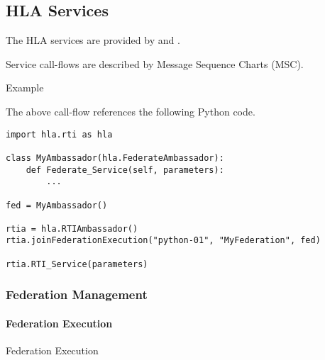 \subsection{HLA Services}

The HLA services are provided by  and .

Service call-flows are described by Message Sequence Charts (MSC).

\begin{hlamsc}{Example}

\nextlevel
{}
\end{hlamsc}

The above call-flow references the following Python code.

\begin{verbatim}
import hla.rti as hla

class MyAmbassador(hla.FederateAmbassador):
    def Federate_Service(self, parameters):
        ...

fed = MyAmbassador()

rtia = hla.RTIAmbassador()
rtia.joinFederationExecution("python-01", "MyFederation", fed)

rtia.RTI_Service(parameters)
\end{verbatim}

\subsubsection{Federation Management}

\paragraph{Federation Execution}

\begin{hlamsc}{Federation Execution}

\nextlevel
{}
\nextlevel
{}
\nextlevel
{}
\nextlevel
{}
\nextlevel
{}
\nextlevel
{}
\nextlevel
{}
\nextlevel
{}
\nextlevel
{}
\nextlevel
\end{hlamsc}

